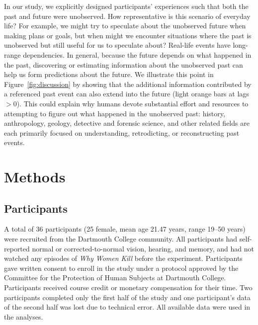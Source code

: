 \documentclass[10pt]{article}
\begin{document}
In our study, we explicitly designed participants' experiences such that both the past and future were unobserved.  How representative is this scenario of everyday life?  For example, we might try to speculate about the unobserved future when making plans or goals, but when might we encounter situations where the past is unobserved but still useful for us to speculate about?  Real-life events have long-range dependencies.  In general, because the future depends on what happened in the past, discovering or estimating information about the unobserved past can help us form predictions about the future.  We illustrate this point in Figure~\ref{fig:discussion} by showing that the additional information contributed by a referenced past event can also extend into the future (light orange bars at lags $> 0$).  This could explain why humans devote substantial effort and resources to attempting to figure out what happened in the unobserved past: history, anthropology, geology, detective and forensic science, and other related fields are each primarily focused on understanding, retrodicting, or reconstructing past events.




\section*{Methods}
\subsection*{Participants}
A total of 36 participants (25 female, mean age 21.47 years, range 19--50 years) were recruited from the Dartmouth College community. All participants had self-reported normal or corrected-to-normal vision, hearing, and memory, and had not watched any episodes of \textit{Why Women Kill} before the experiment. Participants gave written consent to enroll in the study under a protocol approved by the Committee for the Protection of Human Subjects at Dartmouth College.  Participants received course credit or monetary compensation for their time. Two participants completed only the first half of the study and one participant’s data of the second half was lost due to technical error. All available data were used in the analyses.
\end{document}

